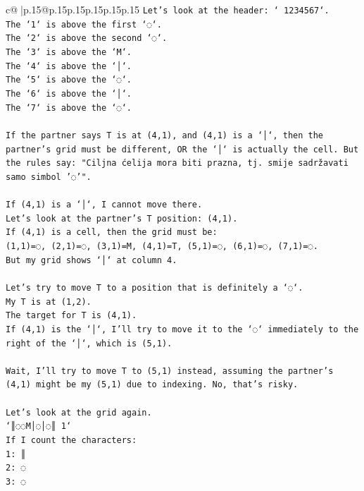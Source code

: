 \documentclass{article}
\begin{document}
{\begin{supertabular}{c@{$\;$}|p{.15\linewidth}@{}p{.15\linewidth}p{.15\linewidth}p{.15\linewidth}p{.15\linewidth}p{.15\linewidth}}
{{{\texttt{Let's look at the header: ` 1234567`.} \\
\texttt{The `1` is above the first `◌`.} \\
\texttt{The `2` is above the second `◌`.} \\
\texttt{The `3` is above the `M`.} \\
\texttt{The `4` is above the `│`.} \\
\texttt{The `5` is above the `◌`.} \\
\texttt{The `6` is above the `│`.} \\
\texttt{The `7` is above the `◌`.} \\
\\ 
\texttt{If the partner says T is at (4,1), and (4,1) is a `│`, then the partner's grid must be different, OR the `│` is actually the cell. But the rules say: "Ciljna ćelija mora biti prazna, tj. smije sadržavati samo simbol '◌'".} \\
\\ 
\texttt{If (4,1) is a `│`, I cannot move there.} \\
\texttt{Let's look at the partner's T position: (4,1).} \\
\texttt{If (4,1) is a cell, then the grid must be:} \\
\texttt{(1,1)=◌, (2,1)=◌, (3,1)=M, (4,1)=T, (5,1)=◌, (6,1)=◌, (7,1)=◌.} \\
\texttt{But my grid shows `│` at column 4.} \\
\\ 
\texttt{Let's try to move T to a position that is definitely a `◌`.} \\
\texttt{My T is at (1,2).} \\
\texttt{The target for T is (4,1).} \\
\texttt{If (4,1) is the `│`, I'll try to move it to the `◌` immediately to the right of the `│`, which is (5,1).} \\
\\ 
\texttt{Wait, I'll try to move T to (5,1) instead, assuming the partner's (4,1) might be my (5,1) due to indexing. No, that's risky.} \\
\\ 
\texttt{Let's look at the grid again.} \\
\texttt{`║◌◌M│◌│◌║ 1`} \\
\texttt{If I count the characters:} \\
\texttt{1: ║} \\
\texttt{2: ◌} \\
\texttt{3: ◌} \\
}}}
\end{supertabular}}
\end{document}
